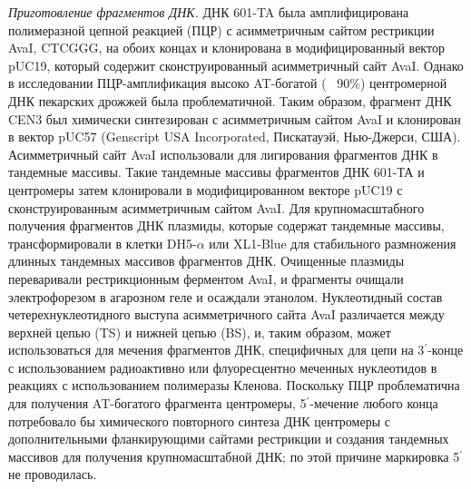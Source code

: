 \emph{Приготовление фрагментов ДНК.} ДНК 601-TA была амплифицирована полимеразной цепной реакцией (ПЦР) с асимметричным сайтом рестрикции AvaI, CTCGGG, на обоих концах и клонирована в модифицированный вектор pUC19, который содержит сконструированный асимметричный сайт AvaI. Однако в исследовании ПЦР-амплификация высоко AT-богатой (~ 90\%) центромерной ДНК пекарских дрожжей была проблематичной. Таким образом, фрагмент ДНК CEN3 был химически синтезирован с асимметричным сайтом AvaI и клонирован в вектор pUC57 (Genscript USA Incorporated, Пискатауэй, Нью-Джерси, США). Асимметричный сайт AvaI использовали для лигирования фрагментов ДНК в тандемные массивы. Такие тандемные массивы фрагментов ДНК 601-ТА и центромеры затем клонировали в модифицированном векторе pUC19 с сконструированным асимметричным сайтом AvaI. Для крупномасштабного получения фрагментов ДНК плазмиды, которые содержат тандемные массивы, трансформировали в клетки DH5-$\alpha$ или XL1-Blue для стабильного размножения длинных тандемных массивов фрагментов ДНК. Очищенные плазмиды переваривали рестрикционным ферментом AvaI, и фрагменты очищали электрофорезом в агарозном геле и осаждали этанолом. Нуклеотидный состав четерехнуклеотидного выступа асимметричного сайта AvaI различается между верхней цепью (TS) и нижней цепью (BS), и, таким образом, может использоваться для мечения фрагментов ДНК, специфичных для цепи на 3$^\prime$-конце  с использованием радиоактивно или флуоресцентно меченных нуклеотидов в реакциях с использованием полимеразы Кленова. Поскольку ПЦР проблематична для получения AT-богатого фрагмента центромеры, 5$^\prime$-мечение любого конца потребовало бы химического повторного синтеза ДНК центромеры с дополнительными фланкирующими сайтами рестрикции и создания тандемных массивов для получения крупномасштабной ДНК; по этой причине маркировка 5$^\prime$ не проводилась.


